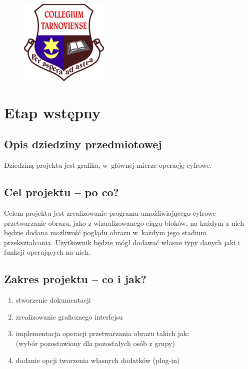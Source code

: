\documentclass[a4paper,10pt]{article}
\title{\textbf{\begin{LARGE}P.I.W.O. 1.0\end{LARGE}}\\\underline{Projekt Informatyczny} \\ Wilqu \& Others \\\textbf{Dokumentacja Techniczna}}
\author{Piotr Wilk \and Piotr Zegar \and Mateusz Tylek \and Mateusz Kocąb \and Wojciech Zbiegieł \and Sławomir Librant \and  Marek Prząda}
\begin{document}
\maketitle
\begin{figure}[h]
 \centering
\includegraphics{logo}
\begin{center}
\begin{center}

\end{center}

\end{center}

\end{figure}
\newpage
\tableofcontents
\newpage
\section{Etap wstępny}
\subsection{Opis dziedziny przedmiotowej}
Dziedziną projektu jest grafika, w~głównej mierze operację cyfrowe. 
\subsection{Cel projektu – po co?}
Celem projektu jest zrealizowanie programu umożliwiającego cyfrowe przetwarzanie obrazu, jako z wizualizowanego ciągu bloków, na każdym z nich będzie dodana możliwość poglądu obrazu w~każdym jego stadium przekształcania. Użytkownik będzie mógł dodawać własne typy danych jaki i funkcji operujących na nich. 
\subsection{Zakres projektu – co i jak?}
\begin{enumerate}
\item stworzenie dokumentacji
\item zrealizowanie graficznego interfejsu
\item implementacja operacji przetwarzania obrazu takich jak: \\
(wybór pozostawiony dla pozostałych osób z grupy)
\item dodanie opcji tworzenia własnych dodatków (plug-in)
\end{enumerate}
\end{document}

